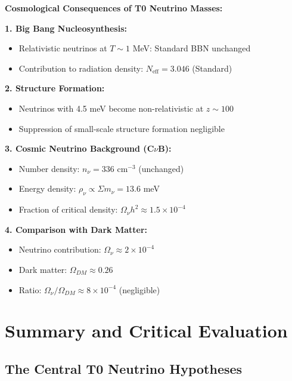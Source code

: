 \documentclass[12pt,a4paper]{article}
\begin{document}
	\begin{keyresult}
		\textbf{Cosmological Consequences of T0 Neutrino Masses:}
		
		\textbf{1. Big Bang Nucleosynthesis:}
		\begin{itemize}
			\item Relativistic neutrinos at $T \sim 1$ MeV: Standard BBN unchanged
			\item Contribution to radiation density: $N_{\text{eff}} = 3.046$ (Standard)
		\end{itemize}
		
		\textbf{2. Structure Formation:}
		\begin{itemize}
			\item Neutrinos with 4.5 meV become non-relativistic at $z \sim 100$
			\item Suppression of small-scale structure formation negligible
		\end{itemize}
		
		\textbf{3. Cosmic Neutrino Background (C$\nu$B):}
		\begin{itemize}
			\item Number density: $n_\nu = 336$ cm$^{-3}$ (unchanged)
			\item Energy density: $\rho_\nu \propto \Sigma m_\nu = 13.6$ meV
			\item Fraction of critical density: $\Omega_\nu h^2 \approx 1.5 \times 10^{-4}$
		\end{itemize}
		
		\textbf{4. Comparison with Dark Matter:}
		\begin{itemize}
			\item Neutrino contribution: $\Omega_\nu \approx 2 \times 10^{-4}$
			\item Dark matter: $\Omega_{DM} \approx 0.26$
			\item Ratio: $\Omega_\nu/\Omega_{DM} \approx 8 \times 10^{-4}$ (negligible)
		\end{itemize}
	\end{keyresult}
	
	\section{Summary and Critical Evaluation}
	
	\subsection{The Central T0 Neutrino Hypotheses}
	
\end{document}
